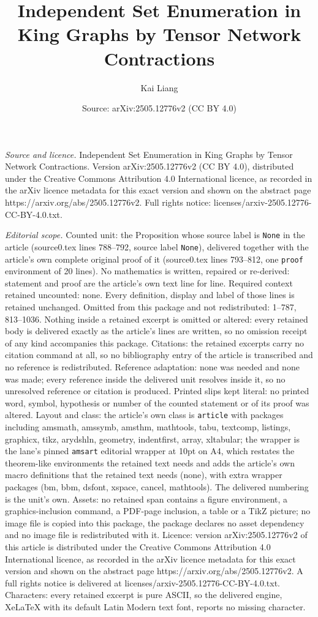 \documentclass[10pt,a4paper]{amsart}
\title[Independent Set Enumeration in King Graphs by Tensor Network]{Independent Set Enumeration in King Graphs by Tensor Network Contractions}
\author{Kai Liang}
\date{Source: arXiv:2505.12776v2 (CC BY 4.0)}
\begin{document}
\maketitle

\noindent\emph{Source and licence.} Independent Set Enumeration in King Graphs by Tensor Network Contractions. Version arXiv:2505.12776v2 (CC BY 4.0), distributed under the Creative Commons Attribution 4.0 International licence, as recorded in the arXiv licence metadata for this exact version and shown on the abstract page https://arxiv.org/abs/2505.12776v2. Full rights notice: licenses/arxiv-2505.12776-CC-BY-4.0.txt.\par\smallskip

\noindent\textit{Editorial scope.} Counted unit: the Proposition whose source label is \texttt{None} in the article (source0.tex lines 788--792, source label \texttt{None}), delivered together with the article's own complete original proof of it (source0.tex lines 793--812, one \texttt{proof} environment of 20 lines). No mathematics is written, repaired or re-derived: statement and proof are the article's own text line for line. Required context retained uncounted: none. Every definition, display and label of those lines is retained unchanged. Omitted from this package and not redistributed: 1--787, 813--1036. Nothing inside a retained excerpt is omitted or altered: every retained body is delivered exactly as the article's lines are written, so no omission receipt of any kind accompanies this package. Citations: the retained excerpts carry no citation command at all, so no bibliography entry of the article is transcribed and no reference is redistributed. Reference adaptation: none was needed and none was made; every reference inside the delivered unit resolves inside it, so no unresolved reference or citation is produced. Printed slips kept literal: no printed word, symbol, hypothesis or number of the counted statement or of its proof was altered. Layout and class: the article's own class is \texttt{article} with packages including amsmath, amssymb, amsthm, mathtools, tabu, textcomp, listings, graphicx, tikz, arydshln, geometry, indentfirst, array, xltabular; the wrapper is the lane's pinned \texttt{amsart} editorial wrapper at 10pt on A4, which restates the theorem-like environments the retained text needs and adds the article's own macro definitions that the retained text needs (none), with extra wrapper packages (bm, bbm, dsfont, xspace, cancel, mathtools). The delivered numbering is the unit's own. Assets: no retained span contains a figure environment, a graphics-inclusion command, a PDF-page inclusion, a table or a TikZ picture; no image file is copied into this package, the package declares no asset dependency and no image file is redistributed with it. Licence: version arXiv:2505.12776v2 of this article is distributed under the Creative Commons Attribution 4.0 International licence, as recorded in the arXiv licence metadata for this exact version and shown on the abstract page https://arxiv.org/abs/2505.12776v2. A full rights notice is delivered at licenses/arxiv-2505.12776-CC-BY-4.0.txt. Characters: every retained excerpt is pure ASCII, so the delivered engine, XeLaTeX with its default Latin Modern text font, reports no missing character.
\end{document}
